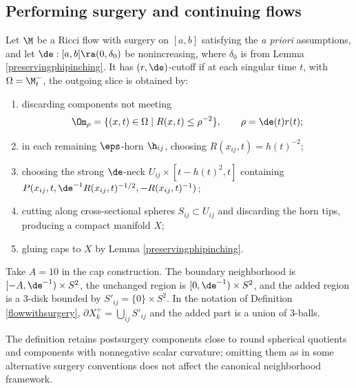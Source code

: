 \subsection{Performing surgery and continuing flows}
\label{II.4.4}

\begin{definition}
  \label{def:kl-performing-surgery-continuing-flows-ricci-flow-cutoff}
\label{rdeltacutoffflowdef}
Let $\M$ be a Ricci flow with surgery on $[a,b]$ satisfying the
\emph{a priori} assumptions, and let $\de:[a,b]\ra(0,\delta_0)$ be nonincreasing,
where $\delta_0$ is from Lemma \ref{preservingphipinching}. It has
$(r,\de)$-cutoff if at each singular time $t$, with
$\Omega=\M_t^-$, the outgoing slice is obtained by:
\begin{enumerate}
\item discarding components not meeting
\[
\Om_\rho=\{(x,t)\in\Omega\mid R(x,t)\leq\rho^{-2}\},\qquad
\rho=\de(t)r(t);
\]
\item in each remaining $\eps$-horn $\h_{ij}$, choosing
$R(x_{ij},t)=h(t)^{-2}$;
\item choosing the strong $\de$-neck
$U_{ij}\times[t-h(t)^2,t]$ containing
$P(x_{ij},t,\de^{-1}R(x_{ij},t)^{-1/2},-R(x_{ij},t)^{-1})$;
\item cutting along cross-sectional spheres $S_{ij}\subset U_{ij}$ and
discarding the horn tips, producing a compact manifold $X$;
\item gluing caps to $X$ by Lemma \ref{preservingphipinching}.
\end{enumerate}
\end{definition}

Take $A=10$ in the cap construction. The boundary neighborhood is
$[-A,\de^{-1})\times S^2$, the unchanged region is
$[0,\de^{-1})\times S^2$, and the added region is a $3$-disk bounded by
$S'_{ij}=\{0\}\times S^2$. In the notation of Definition
\ref{flowwithsurgery}, $\partial X_k^+=\bigcup_{ij}S'_{ij}$ and the
added part is a union of $3$-balls.

\begin{remark}
  \label{rem:kl-performing-surgery-continuing-flows-existence-canonical-neighborhoods}
The definition retains postsurgery components close to round spherical
quotients and components with nonnegative scalar curvature; omitting them as
in some alternative surgery conventions does not affect the canonical
neighborhood framework.
\end{remark}

